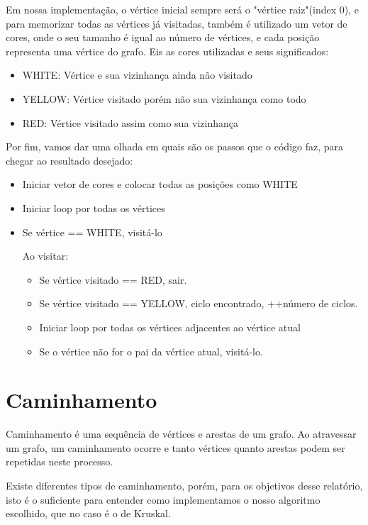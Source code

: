 \documentclass[12pt]{article}
\begin{document}
    Em nossa implementação, o vértice inicial sempre será o "vértice raiz"(index 0), 
    e para memorizar todas as vértices já visitadas, também é utilizado um vetor de cores,
    onde o seu tamanho é igual ao número de vértices, e cada posição representa uma vértice do 
    grafo. Eis as cores utilizadas e seus significados:

    \begin{itemize}
      \item WHITE: Vértice e sua vizinhança ainda não visitado 
      \item YELLOW: Vértice visitado porém não sua vizinhança como todo
      \item RED: Vértice visitado assim como sua vizinhança
    \end{itemize}

    Por fim, vamos dar uma olhada em quais são os passos que o código 
    faz, para chegar ao resultado desejado:

    \begin{itemize}
      \item Iniciar vetor de cores e colocar todas as posições como WHITE
      \item Iniciar loop por todas os vértices 
      \item Se vértice == WHITE, visitá-lo
      
      Ao visitar:
      \begin{itemize}
        \item Se vértice visitado == RED, sair.
        \item Se vértice visitado == YELLOW, ciclo encontrado, ++número de ciclos.
        \item Iniciar loop por todas os vértices adjacentes ao vértice atual 
        \item Se o vértice não for o pai da vértice atual, visitá-lo.
      \end{itemize}
    \end{itemize}

  \section{Caminhamento} \label{sec:walking}

  Caminhamento é uma sequência de vértices e arestas de um grafo. Ao atravessar um grafo,
  um caminhamento ocorre e tanto vértices quanto arestas podem ser repetidas neste processo.

  Existe diferentes tipos de caminhamento, porém, para os objetivos desse relatório, isto 
  é o suficiente para entender como implementamos o nosso algoritmo escolhido, que no caso 
  é o de Kruskal.
\end{document}
